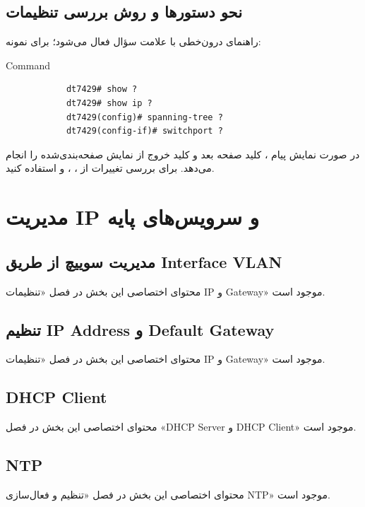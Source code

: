 \documentclass[11pt,letterpaper]{report}
\begin{document}
	\section{نحو دستورها و روش بررسی تنظیمات}
	راهنمای درون‌خطی با علامت سؤال فعال می‌شود؛ برای نمونه:
	\begin{LTR}
		\begin{cliexample}{Command}
			\begin{verbatim}
			dt7429# show ?
			dt7429# show ip ?
			dt7429(config)# spanning-tree ?
			dt7429(config-if)# switchport ?
			\end{verbatim}
		\end{cliexample}
	\end{LTR}
	در صورت نمایش پیام ، کلید  صفحه بعد و
	کلید  خروج از نمایش صفحه‌بندی‌شده را انجام می‌دهد. برای
	بررسی تغییرات از ، ،
	 و  استفاده
		کنید.

	\chapter{مدیریت IP و سرویس‌های پایه}

	\section{مدیریت سوییچ از طریق Interface VLAN}
	محتوای اختصاصی این بخش در فصل «تنظیمات IP و Gateway» موجود است.

	\section{تنظیم IP Address و Default Gateway}
	محتوای اختصاصی این بخش در فصل «تنظیمات IP و Gateway» موجود است.

	\section{DHCP Client}
	محتوای اختصاصی این بخش در فصل «DHCP Server و DHCP Client» موجود است.

	\section{NTP}
	محتوای اختصاصی این بخش در فصل «تنظیم و فعال‌سازی NTP» موجود است.
\end{document}
